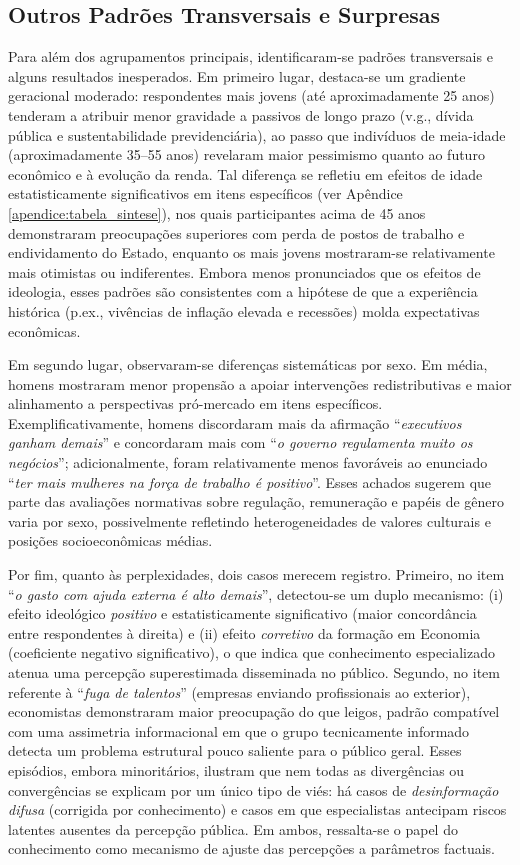 \subsection{Outros Padrões Transversais e Surpresas}
Para além dos agrupamentos principais, identificaram-se padrões transversais e alguns resultados inesperados. Em primeiro lugar, destaca-se um gradiente geracional moderado: respondentes mais jovens (até aproximadamente 25 anos) tenderam a atribuir menor gravidade a passivos de longo prazo (v.g., dívida pública e sustentabilidade previdenciária), ao passo que indivíduos de meia-idade (aproximadamente 35--55 anos) revelaram maior pessimismo quanto ao futuro econômico e à evolução da renda. Tal diferença se refletiu em efeitos de idade estatisticamente significativos em itens específicos (ver Apêndice \autoref{apendice:tabela_sintese}), nos quais participantes acima de 45 anos demonstraram preocupações superiores com perda de postos de trabalho e endividamento do Estado, enquanto os mais jovens mostraram-se relativamente mais otimistas ou indiferentes. Embora menos pronunciados que os efeitos de ideologia, esses padrões são consistentes com a hipótese de que a experiência histórica (p.ex., vivências de inflação elevada e recessões) molda expectativas econômicas.

Em segundo lugar, observaram-se diferenças sistemáticas por sexo. Em média, homens mostraram menor propensão a apoiar intervenções redistributivas e maior alinhamento a perspectivas pró-mercado em itens específicos. Exemplificativamente, homens discordaram mais da afirmação ``\textit{executivos ganham demais}'' e concordaram mais com ``\textit{o governo regulamenta muito os negócios}''; adicionalmente, foram relativamente menos favoráveis ao enunciado ``\textit{ter mais mulheres na força de trabalho é positivo}''. Esses achados sugerem que parte das avaliações normativas sobre regulação, remuneração e papéis de gênero varia por sexo, possivelmente refletindo heterogeneidades de valores culturais e posições socioeconômicas médias.

Por fim, quanto às perplexidades, dois casos merecem registro. Primeiro, no item ``\textit{o gasto com ajuda externa é alto demais}'', detectou-se um duplo mecanismo: (i) efeito ideológico \textit{positivo} e estatisticamente significativo (maior concordância entre respondentes à direita) e (ii) efeito \textit{corretivo} da formação em Economia (coeficiente negativo significativo), o que indica que conhecimento especializado atenua uma percepção superestimada disseminada no público. Segundo, no item referente à ``\textit{fuga de talentos}'' (empresas enviando profissionais ao exterior), economistas demonstraram maior preocupação do que leigos, padrão compatível com uma assimetria informacional em que o grupo tecnicamente informado detecta um problema estrutural pouco saliente para o público geral. Esses episódios, embora minoritários, ilustram que nem todas as divergências ou convergências se explicam por um único tipo de viés: há casos de \textit{desinformação difusa} (corrigida por conhecimento) e casos em que especialistas antecipam riscos latentes ausentes da percepção pública. Em ambos, ressalta-se o papel do conhecimento como mecanismo de ajuste das percepções a parâmetros factuais.

